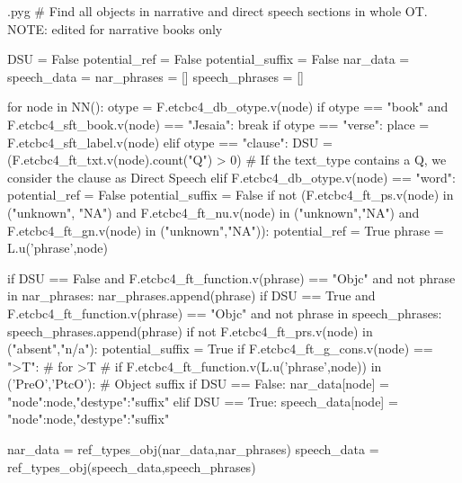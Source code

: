 \documentclass{report}
\makeatletter
\newenvironment{python}{%
  \VerbatimEnvironment
  \minted@resetoptions
  \setkeys{minted@opt}{}
      \begin{VerbatimOut}{\jobname.pyg}}
{%
      \end{VerbatimOut}
      \minted@pygmentize{python}
      \DeleteFile{\jobname.pyg}}
\makeatother
\begin{document}
\begin{python}
# Find all objects in narrative and direct speech sections in whole OT. NOTE: edited for narrative books only

DSU = False
potential_ref = False
potential_suffix = False
nar_data = {}
speech_data = {}
nar_phrases = []
speech_phrases = []

for node in NN():
    otype = F.etcbc4_db_otype.v(node)
    if otype == "book" and F.etcbc4_sft_book.v(node) == "Jesaia":
        break
    if otype == "verse":
        place = F.etcbc4_sft_label.v(node)
    elif otype == "clause":
        DSU = (F.etcbc4_ft_txt.v(node).count("Q") > 0)    # If the text_type contains a Q, we consider the clause as Direct Speech
    elif F.etcbc4_db_otype.v(node) == "word":
        potential_ref = False
        potential_suffix = False
        if not (F.etcbc4_ft_ps.v(node) in ("unknown", "NA") and F.etcbc4_ft_nu.v(node) in ("unknown","NA") and F.etcbc4_ft_gn.v(node) in ("unknown","NA")):
            potential_ref = True
            phrase = L.u('phrase',node)
            
            if DSU == False and F.etcbc4_ft_function.v(phrase) == "Objc" and not phrase in nar_phrases:
                nar_phrases.append(phrase)
            if DSU == True and F.etcbc4_ft_function.v(phrase) == "Objc" and not phrase in speech_phrases:
                speech_phrases.append(phrase) 
        if not F.etcbc4_ft_prs.v(node) in ("absent","n/a"):
            potential_suffix = True
            if F.etcbc4_ft_g_cons.v(node) == ">T": # for >T
#            if F.etcbc4_ft_function.v(L.u('phrase',node)) in ('PreO','PtcO'): # Object suffix
                if DSU == False:
                    nar_data[node] = {"node":node,"destype":"suffix"}
                elif DSU == True:
                    speech_data[node] = {"node":node,"destype":"suffix"}

nar_data = ref_types_obj(nar_data,nar_phrases)
speech_data = ref_types_obj(speech_data,speech_phrases)

\end{python}
\end{document}
